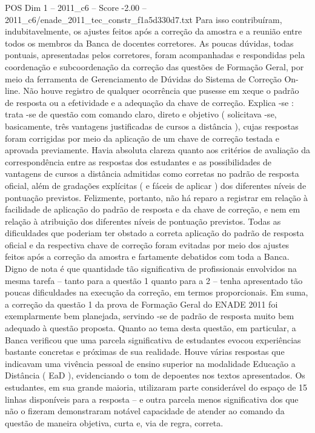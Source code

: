 \begin{textsample}{POS Dim 1 – 2011\_c6 – Score -2.00 – 2011\_c6/enade\_2011\_tec\_constr\_f1a5d330d7.txt}
Para isso contribuíram, indubitavelmente, os ajustes feitos após a correção da amostra e a reunião entre todos os membros da Banca de docentes corretores.
As poucas dúvidas, todas pontuais, apresentadas pelos corretores, foram acompanhadas e respondidas pela coordenação e subcoordenação da correção das questões de Formação Geral, por meio da ferramenta de Gerenciamento de Dúvidas do Sistema de Correção On-line.
Não houve registro de qualquer ocorrência que pusesse em xeque o padrão de resposta ou a efetividade e a adequação da chave de correção.
Explica -se : trata -se de questão com comando claro, direto e objetivo ( solicitava -se, basicamente, três vantagens justificadas de cursos a distância ), cujas respostas foram corrigidas por meio da aplicação de um chave de correção testada e aprovada previamente.
Havia absoluta clareza quanto aos critérios de avaliação da correspondência entre as respostas dos estudantes e as possibilidades de vantagens de cursos a distância admitidas como corretas no padrão de resposta oficial, além de gradações explícitas ( e fáceis de aplicar ) dos diferentes níveis de pontuação previstos.
Felizmente, portanto, não há reparo a registrar em relação à facilidade de aplicação do padrão de resposta e da chave de correção, e nem em relação à atribuição dos diferentes níveis de pontuação previstos.
Todas as dificuldades que poderiam ter obstado a correta aplicação do padrão de resposta oficial e da respectiva chave de correção foram evitadas por meio dos ajustes feitos após a correção da amostra e fartamente debatidos com toda a Banca.
Digno de nota é que quantidade tão significativa de profissionais envolvidos na mesma tarefa – tanto para a questão 1 quanto para a 2 – tenha apresentado tão poucas dificuldades na execução da correção, em termos proporcionais.
Em suma, a correção da questão 1 da prova de Formação Geral do ENADE 2011 foi exemplarmente bem planejada, servindo -se de padrão de resposta muito bem adequado à questão proposta.
Quanto ao tema desta questão, em particular, a Banca verificou que uma parcela significativa de estudantes evocou experiências bastante concretas e próximas de sua realidade.
Houve várias respostas que indicavam uma vivência pessoal de ensino superior na modalidade Educação a Distância ( EaD ), evidenciando o tom de depoentes nos textos apresentados.
Os estudantes, em sua grande maioria, utilizaram parte considerável do espaço de 15 linhas disponíveis para a resposta – e outra parcela menos significativa dos que não o fizeram demonstraram notável capacidade de atender ao comando da questão de maneira objetiva, curta e, via de regra, correta.

\end{textsample}
